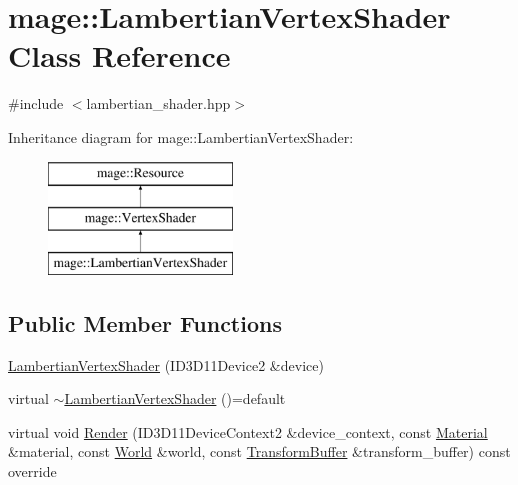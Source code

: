 \hypertarget{classmage_1_1_lambertian_vertex_shader}{}\section{mage\+:\+:Lambertian\+Vertex\+Shader Class Reference}
\label{classmage_1_1_lambertian_vertex_shader}


{\ttfamily \#include $<$lambertian\+\_\+shader.\+hpp$>$}

Inheritance diagram for mage\+:\+:Lambertian\+Vertex\+Shader\+:\begin{figure}[H]
\begin{center}
\leavevmode
\includegraphics[height=3.000000cm]{classmage_1_1_lambertian_vertex_shader}
\end{center}
\end{figure}
\subsection*{Public Member Functions}
\begin{DoxyCompactItemize}
\item 
\hyperlink{classmage_1_1_lambertian_vertex_shader_a62fad2a28086ed7350bffbcf1ba188ed}{Lambertian\+Vertex\+Shader} (I\+D3\+D11\+Device2 \&device)
\item 
virtual \hyperlink{classmage_1_1_lambertian_vertex_shader_a55636fd3817b97b6529690d6e3e5cd46}{$\sim$\+Lambertian\+Vertex\+Shader} ()=default
\item 
virtual void \hyperlink{classmage_1_1_lambertian_vertex_shader_a78571908e61d9a93f834c2e9354c1d9b}{Render} (I\+D3\+D11\+Device\+Context2 \&device\+\_\+context, const \hyperlink{structmage_1_1_material}{Material} \&material, const \hyperlink{classmage_1_1_world}{World} \&world, const \hyperlink{structmage_1_1_transform_buffer}{Transform\+Buffer} \&transform\+\_\+buffer) const override
\end{DoxyCompactItemize}
